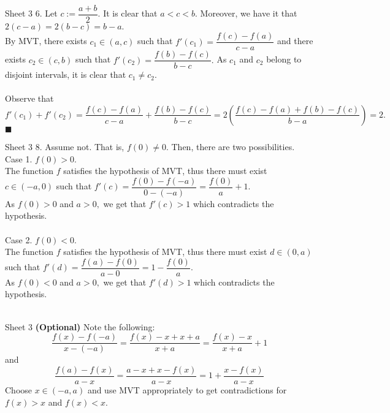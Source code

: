 \documentclass[handout, aspectratio=169]{beamer}
\begin{document}
\begin{frame}{Sheet 3}
	6. Let $c := \dfrac{a+b}{2}.$ It is clear that $a < c < b.$ Moreover, we have it that $2(c - a) = 2(b - c) = b-a.$\\
	By MVT, there exists $c_1 \in (a, c)$ such that $f'(c_1) = \dfrac{f(c) - f(a)}{c - a}$ and there exists $c_2 \in (c, b)$ such that $f'(c_2) = \dfrac{f(b) - f(c)}{b - c}.$ As $c_1$ and $c_2$ belong to disjoint intervals, it is clear that $c_1 \neq c_2.$\\~\\
	Observe that $f'(c_1) + f'(c_2) = \dfrac{f(c) - f(a)}{c - a} + \dfrac{f(b) - f(c)}{b - c} = 2\left(\dfrac{f(c) - f(a) + f(b) - f(c)}{b - a}\right) = 2.$ \hfill $\blacksquare$
\end{frame}
\begin{frame}{Sheet 3}
	8. Assume not. That is, $f(0) \neq 0.$ Then, there are two possibilities.\\
	Case 1. $f(0) > 0.$\\
	The function $f$ satisfies the hypothesis of MVT, thus there must exist $c \in (-a, 0)$ such that $f'(c) = \dfrac{f(0) - f(-a)}{0 - (-a)} = \dfrac{f(0)}{a} + 1.$\\
	As $f(0) > 0$ and $a > 0,$ we get that $f'(c) > 1$ which contradicts the hypothesis.\\~\\
	Case 2. $f(0) < 0.$\\
	The function $f$ satisfies the hypothesis of MVT, thus there must exist $d \in (0, a)$ such that $f'(d) = \dfrac{f(a) - f(0)}{a - 0} =1 - \dfrac{f(0)}{a}.$\\
	As $f(0) < 0$ and $a > 0,$ we get that $f'(d) > 1$ which contradicts the hypothesis.\\~\\
\end{frame}
\begin{frame}{Sheet 3}
	\textbf{(Optional)} Note the following:
	\[\dfrac{f(x) - f(-a)}{x - (-a)} = \dfrac{f(x) - x + x + a}{x + a} = \dfrac{f(x) - x}{x + a} + 1\]
	and
	\[\dfrac{f(a) - f(x)}{a - x} = \dfrac{a - x + x - f(x)}{a - x} = 1 + \dfrac{x - f(x)}{a - x}\]
	Choose $x \in (-a, a)$ and use MVT appropriately to get contradictions for $f(x) > x$ and $f(x) < x.$
\end{frame}
\end{document}
